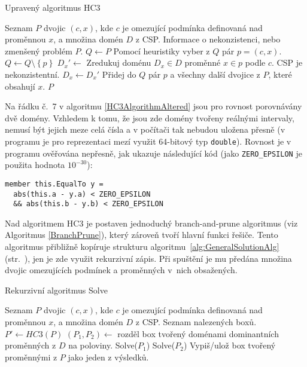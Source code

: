 \begin{algorithm}
\caption{Upravený algoritmus HC3}
\label{HC3AlgorithmAltered}
\begin{algorithmic}[1]
\Require Seznam $P$ dvojic $(c, x)$, kde $c$ je omezující podmínka definovaná nad proměnnou $x$, a množina domén $D$ z CSP.
\Ensure Informace o nekonzistenci, nebo zmenšený problém $P$.
\State $Q \gets P$
\State Pomocí heuristiky vyber z $Q$ pár $p = (c, x)$.
\State $Q \gets Q \setminus \left\{ p \right\}$
\State $D_x' \gets$ Zredukuj doménu $D_x \in D$ proměnné $x \in p$ podle $c$.
\State \Return CSP je nekonzistentní.
\EndIf
{}
\State $D_x \gets D_x'$
\State Přidej do $Q$ pár $p$ a všechny další dvojice z $P$, které obsahují $x$.
\EndIf
\EndWhile
\State \Return $P$
\EndProcedure
\end{algorithmic}
\end{algorithm}

Na řádku č.~7 v algoritmu \ref{HC3AlgorithmAltered} jsou pro rovnost porovnávány dvě domény. Vzhledem k tomu, že jsou zde domény tvořeny reálnými intervaly, nemusí být jejich meze celá čísla a v počítači tak nebudou uložena přesně (v programu je pro reprezentaci mezí využit 64-bitový typ \verb|double|). Rovnost je v programu ověřována nepřesně, jak ukazuje následující kód (jako \verb|ZERO_EPSILON| je použita hodnota $10^{-30}$):

\begin{Verbatim}[samepage=true]
member this.EqualTo y =
  abs(this.a - y.a) < ZERO_EPSILON 
  && abs(this.b - y.b) < ZERO_EPSILON
\end{Verbatim}

Nad algoritmem HC3 je postaven jednoduchý branch-and-prune algoritmus (viz Algoritmus \ref{BranchPrune}), který zároveň tvoří hlavní funkci řešiče. Tento algoritmus přibližně kopíruje strukturu algoritmu~\ref{alg:GeneralSolutionAlg} (str.~\pageref{alg:GeneralSolutionAlg}), jen je zde využit rekurzivní zápis. Při spuštění je mu předána množina dvojic omezujících podmínek a proměnných v~nich obsažených.

\begin{algorithm}
\caption{Rekurzivní algoritmus Solve}
\label{BranchPrune}
\begin{algorithmic}[1]
\Require Seznam $P$ dvojic $(c, x)$, kde $c$ je omezující podmínka definovaná nad proměnnou $x$, a množina domén $D$ z CSP.
\Ensure Seznam nalezených boxů.
\State $P' \gets HC3(P)$
\State $(P_1, P_2) \gets $ rozděl box tvořený doménami dominantních proměnných z $D$ na poloviny.
\State Solve($P_1$)
\State Solve($P_2$)
\Else
\State Vypiš/ulož box tvořený proměnnými z $P$ jako jeden z výsledků.
\EndIf
\EndProcedure
\end{algorithmic}
\end{algorithm}

